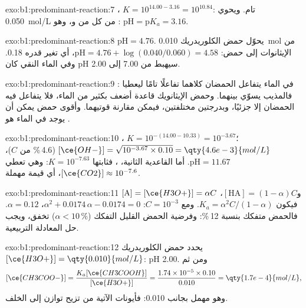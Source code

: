 \begin{solution}{exo:b1:predominant-reaction:7}
، $K = 10^{14.00 - 3.16} = 10^{10.84}$: تام. ويحوي
 \qty{0.050}{mol/L} من كل من  و، وهو
: $\mathrm{pH} = \mathrm{p}K_a = 3.16$.
\end{solution}

\begin{solution}{exo:b1:predominant-reaction:8}
$\mathrm{pH} = 4.76$. يحوّل حمض الكلوريدريك \qty{0.010}{mol} من
الإيثانوات إلى حمض: $\mathrm{pH} = 4.76 + \log(0.040/0.060) = 4.58$، أي
تغير قدره 0.18. وفي الماء النقي كان pH سيهبط من 7.00 إلى 2.00.
\end{solution}

\begin{solution}{exo:b1:predominant-reaction:9}
في الماء يتفاعل الحمضان كلاهما تفاعلًا تامًا ليعطيا : فالمذيب
يسوّي بينهما. وحمض الإيثانويك قاعدة أضعف بكثير من الماء، فلا يتفاعل
فيه الحمضان إلا جزئيًا، وبدرجتين مختلفتين، فيمكن مقارنة
قوتيهما. وأقوى حمض يمكن أن يوجد في الماء هو .
\end{solution}

\begin{solution}{exo:b1:predominant-reaction:10}
، $K = 10^{-(14.00 - 10.33)} = 10^{-3.67}$؛
$[\ce{OH-}] = \sqrt{10^{-3.67} \times 0.10} = \qty{4.6e-3}{mol/L}$ (4.6\,\%
من $C$)، $\mathrm{pH} = 11.67$. أما القاعدية الثانية، ، فثابتها $K = 10^{-7.63}$: وهي تعطي $[\ce{CO2}] \approx
10^{-7.6}$، أي قيمة مهملة.
\end{solution}

\begin{solution}{exo:b1:predominant-reaction:11}
$[\mathrm{A}] = [\ce{H3O+}] = \alpha C$ و$[\mathrm{HA}] = (1 - \alpha)C$،
فيكون $K_a = \alpha^2C/(1 - \alpha)$. ومع $C = 10^{-3}$: $\alpha^2 +
0.0174\,\alpha - 0.0174 = 0$، $\alpha = 0.12$. فالحمض متفكك بنسبة 12\,\%:
وفرضية الحمض القليل التفكك ($\alpha <
10\,\%$) تخفق، ويجب حل المعادلة التربيعية.
\end{solution}

\begin{solution}{exo:b1:predominant-reaction:12}
يحدد حمض الكلوريدريك $[\ce{H3O+}] = \qty{0.010}{mol/L}$: pH 2.00. ومن ثم
\[
  [\ce{CH3COO-}] = \frac{K_a[\ce{CH3COOH}]}{[\ce{H3O+}]} = \frac{1.74 \times 10^{-5}
  \times 0.10}{0.010} = \qty{1.7e-4}{mol/L},
\]
وهو مهمل بجانب 0.010: فأيونات
 الآتية من  تزيح توازن 
إلى الخلف.
\end{solution}

